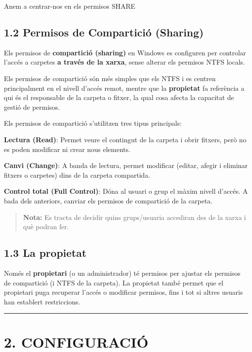 \documentclass[
  a4paper,
]{article}
\begin{document}
Anem a centrar-nos en els permisos SHARE

\subsection{1.2 Permisos de Compartició
(Sharing)}\label{permisos-de-comparticiuxf3-sharing}

Els permisos de \textbf{compartició (sharing)} en Windows es configuren
per controlar l'accés a carpetes \textbf{a través de la xarxa}, sense
alterar els permisos NTFS locals.

Els permisos de compartició són més simples que els NTFS i es centren
principalment en el nivell d'accés remot, mentre que la
\textbf{propietat} fa referència a qui és el responsable de la carpeta o
fitxer, la qual cosa afecta la capacitat de gestió de permisos.

Els permisos de compartició s'utilitzen tres tipus principals:

\textbf{Lectura (Read)}: Permet veure el contingut de la carpeta i obrir
fitxers, però no es poden modificar ni crear nous elements.

\textbf{Canvi (Change)}: A banda de lectura, permet modificar (editar,
afegir i eliminar fitxers o carpetes) dins de la carpeta compartida.

\textbf{Control total (Full Control)}: Dóna al usuari o grup el màxim
nivell d'accés. A bada dels anteriors, canviar els permisos de
compartició de la carpeta.

\begin{quote}
\textbf{Nota:} Es tracta de decidir quins grups/usuaria accediran des de
la xarxa i què podran fer.
\end{quote}

\subsection{1.3 La propietat}\label{la-propietat}

Només el \textbf{propietari} (o un administrador) té permisos per
ajustar els permisos de compartició (i NTFS de la carpeta). La propietat
també permet que el propietari puga recuperar l'accés o modificar
permisos, fins i tot si altres usuaris han establert restriccions.

\begin{center}\rule{0.5\linewidth}{0.5pt}\end{center}

\section{2. CONFIGURACIÓ}\label{configuraciuxf3}
\end{document}
